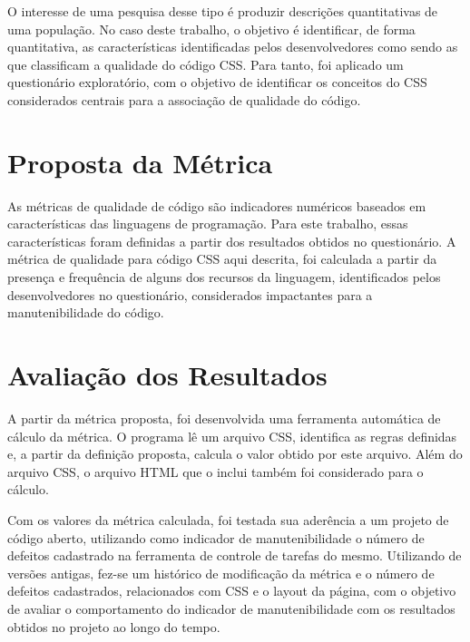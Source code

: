 O interesse de uma pesquisa desse tipo é produzir descrições quantitativas de uma população. No caso deste trabalho, o objetivo é identificar, de forma quantitativa, as características identificadas pelos desenvolvedores como sendo as que classificam a qualidade do código CSS. Para tanto, foi aplicado um questionário exploratório, com o objetivo de identificar os conceitos do CSS considerados centrais para a associação de qualidade do código.

\section{Proposta da Métrica}

As métricas de qualidade de código são indicadores numéricos baseados em características das linguagens de programação. Para este trabalho, essas características foram definidas a partir dos resultados obtidos no questionário. A métrica de qualidade para código CSS aqui descrita, foi calculada a partir da presença e frequência de alguns dos recursos da linguagem, identificados pelos desenvolvedores no questionário, considerados impactantes para a manutenibilidade do código.

\section{Avaliação dos Resultados}

A partir da métrica proposta, foi desenvolvida uma ferramenta automática de cálculo da métrica. O programa lê um arquivo CSS, identifica as regras definidas e, a partir da definição proposta, calcula o valor obtido por este arquivo. Além do arquivo CSS, o arquivo HTML que o inclui também foi considerado para o cálculo.

Com os valores da métrica calculada, foi testada sua aderência a um projeto de código aberto, utilizando como indicador de manutenibilidade o número de defeitos cadastrado na ferramenta de controle de tarefas do mesmo. Utilizando de versões antigas, fez-se um histórico de modificação da métrica e o número de defeitos cadastrados, relacionados com CSS e o layout da página, com o objetivo de avaliar o comportamento do indicador de manutenibilidade com os resultados obtidos no projeto ao longo do tempo.